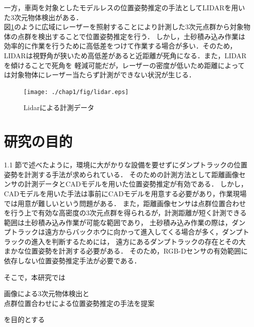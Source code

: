 \newpage

一方，車両を対象としたモデルレスの位置姿勢推定の手法としてLIDARを用いた3次元物体検出がある．\cite{Zhang2017}\cite{Chen2017}\cite{Lang2019}\\
図\ref{fig:Lidar}のように広域にレーザーを照射することにより計測した3次元点群から対象物体の点群を検出することで位置姿勢推定を行う．
しかし，土砂積み込み作業は効率的に作業を行うために高低差をつけて作業する場合が多い．そのため，LIDARは視野角が狭いため高低差があると近距離が死角になる．また，LIDARを傾けることで死角を
軽減可能だが，レーザーの密度が低いため距離によっては対象物体にレーザー当たらず計測ができない状況が生じる．
\begin{figure}[b]
    \begin{center}
    \texttt{[image: ./chap1/fig/lidar.eps]}
    \caption{Lidarによる計測データ}
    \label{fig:Lidar}
    \end{center}
\end{figure}


\newpage
\section{研究の目的}
1.1 節で述べたように，環境に大がかりな設備を要せずにダンプトラックの位置姿勢を計測する手法が求められている．
そのための計測方法として距離画像センサの計測データとCADモデルを用いた位置姿勢推定が有効である．
しかし，CADモデルを用いた手法は事前にCADモデルを用意する必要があり，作業現場では用意が難しいという問題がある．
また，距離画像センサは点群位置合わせを行う上で有効な高密度の3次元点群を得られるが，計測距離が短く計測できる範囲は土砂積み込み作業が可能な範囲であり，
土砂積み込み作業の際は，ダンプトラックは遠方からバックホウに向かって進入してくる場合が多く，ダンプトラックの進入を判断するためには，
遠方にあるダンプトラックの存在とその大まかな位置姿勢を計測する必要がある．
そのため，RGB-Dセンサの有効範囲に依存しない位置姿勢推定手法が必要である．



\par
そこで，本研究では
    \begin{screen}
        \begin{center}
            画像による3次元物体検出と\\点群位置合わせによる位置姿勢推定の手法を提案
        \end{center}
    \end{screen}
を目的とする
\newpage
